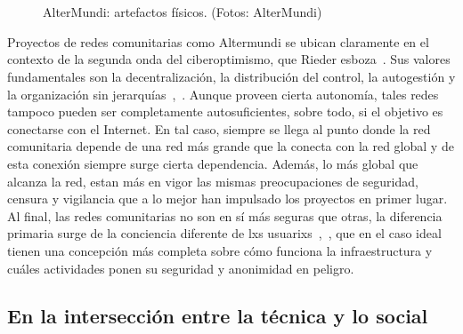 \begin{figure}[h]
\centering
{} \quad
{} \\
 \quad
{} \\
 \quad
{}
\caption[A number of pictures.]{AlterMundi: artefactos físicos. (Fotos: AlterMundi)} %
\label{fig:artifacts}
\end{figure}

Proyectos de redes comunitarias como Altermundi se ubican claramente en el contexto de la segunda onda del ciberoptimismo, que Rieder esboza~\autocite{Rieder2012}.
Sus valores fundamentales son la decentralización, la distribución del control, la autogestión y la organización sin jerarquías~\autocite{FiTre2015},~\autocite{Piccoli2015}.
Aunque proveen cierta autonomía, tales redes tampoco pueden ser completamente autosuficientes, sobre todo, si el objetivo es conectarse con el Internet.
En tal caso, siempre se llega al punto donde la red comunitaria depende de una red más grande que la conecta con la red global y de esta conexión siempre surge cierta dependencia.
Además, lo más global que alcanza la red, estan más en vigor las mismas preocupaciones de seguridad, censura y vigilancia que a lo mejor han impulsado los proyectos en primer lugar.
Al final, las redes comunitarias no son en sí más seguras que otras, la diferencia primaria surge de la conciencia diferente de lxs usuarixs~\autocite{Piccoli2015},~\autocite{FiTre2015}, que en el caso ideal tienen una concepción más completa sobre cómo funciona la infraestructura y cuáles actividades ponen su seguridad y anonimidad en peligro.


\subsection{En la intersección entre la técnica y lo social}

